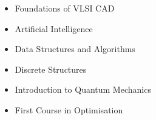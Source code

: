 \documentclass[a4paper,11pt]{article}
\newcommand{\isep}{-2 pt}
\newcommand{\resheading}[1]{{\small \colorbox{mygrey}{\begin{minipage}{0.975\textwidth}{\textbf{#1 \vphantom{p\^{E}}}}\end{minipage}}}}
\begin{document}
\begin{itemize}\itemsep \isep
    \item Foundations of VLSI CAD 
    \item Artificial Intelligence 
    \item Data Structures and Algorithms 
    \item Discrete Structures
    \item Introduction to Quantum Mechanics
    \item First Course in Optimisation
\end{itemize}

\begin{comment}
\resheading{\large{Courses}}
	{\renewcommand{\arraystretch}{1.5}
	\begin{tabular}{|l|c|l|c|}
\hline
\multicolumn{4}{|c|}{\bfseries Electrical and Electronics}\\
\hline
Course & Grade & Course & Grade \\
\hline
Introduction to Electrical Systems &8 & Introduction to Electronics &10 \\
\hline
Network theory  &8 & Electronic Devices and Circuits  &7 \\
\hline
Signals and Systems  &7 & Electrical Machines and Power Electronics &7  \\
\hline
Digital Systems  &10 & Analog Circuits  &10 \\
\hline
Electromagnetic Waves  &NA & Communication Systems  &NA \\
\hline
Microprocessors  &NA & Probability and Random Processes  &NA \\
\hline
Control Systems  &NA & Digital Signal Processing  &NA \\
\hline
Power Systems  &NA & Digital Communications  &NA \\
\hline
System Design &NA & Testing and Verification of VLSI Circuits  &NA\\
\hline
A first course in optimization  &9 & Foundation of VLSI CAD  & NA \\
\hline
\multicolumn{2}{|c}{\bfseries Computer Science} &
\multicolumn{2}{c|}{\bfseries Mathematics} \\
\hline
Computer Programming and Utilization  &10 & Calculus  &10 \\
\hline
Data Structures and Algorithms  &NA & Linear Algebra  &8 \\
\hline
Discrete Structures  &6 &  Differential Equations I  &7 \\
\hline
Artificial Intelligence  &NA & Differential Equations II  &7 \\

\end{comment}
\end{document}
